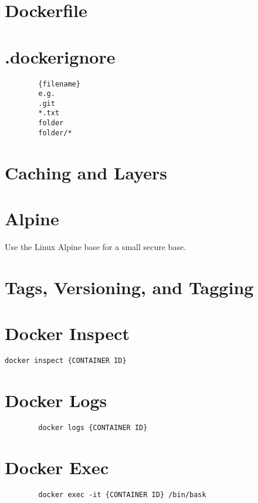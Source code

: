\section{Dockerfile}\label{sec:dockerfile}


\section{.dockerignore}\label{sec:dockerignore}

\begin{lstlisting}
        {filename}
        e.g.
        .git
        *.txt
        folder
        folder/*
\end{lstlisting}

\section{Caching and Layers}\label{sec:caching-and-layers}

\section{Alpine}
Use the Linux Alpine base for a small secure base.

\section{Tags, Versioning, and Tagging}\label{sec:tags,-versioning,-and-tagging}


\section{Docker Inspect}\label{sec:docker-inspect}
\begin{lstlisting}[label={lst:lstlisting5}]
        docker inspect {CONTAINER ID}
\end{lstlisting}

\section{Docker Logs}
\begin{lstlisting}
        docker logs {CONTAINER ID}
\end{lstlisting}

\section{Docker Exec}
\begin{lstlisting}
        docker exec -it {CONTAINER ID} /bin/bask
\end{lstlisting}